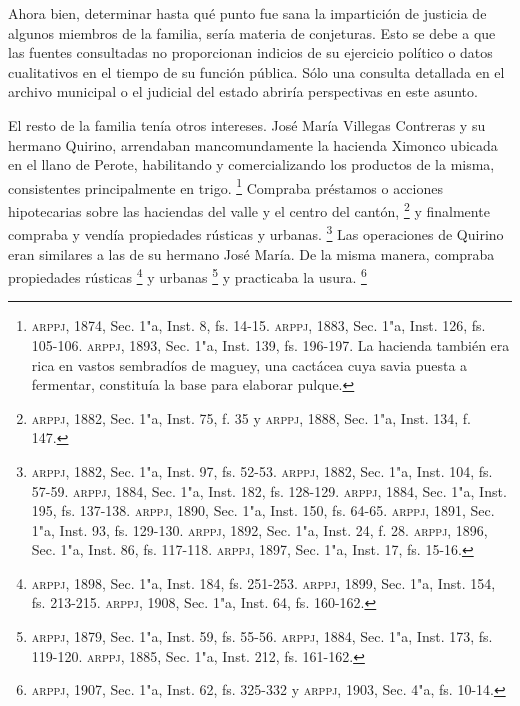 \documentclass[14pt,twoside,final]{extbook} %
\let\oldfootnote\footnote
\renewcommand\footnote[1]{%
\oldfootnote{\hspace{1mm}#1}}
\begin{document}
Ahora bien, determinar hasta qué punto fue sana la impartición de justicia de algunos miembros de la familia, sería materia de conjeturas. Esto se debe a que las fuentes consultadas no proporcionan indicios de su ejercicio político o datos cualitativos en el tiempo de su función pública. Sólo una consulta detallada en el archivo municipal o el judicial del estado abriría perspectivas en este asunto.

El resto de la familia tenía otros intereses. José María Villegas Contreras y su hermano Quirino, arrendaban mancomundamente la hacienda Ximonco ubicada en el llano de Perote, habilitando y comercializando los productos de la misma, consistentes principalmente en trigo.\footnote{\textsc{arppj}, 1874, Sec. 1"a, Inst. 8, fs. 14-15. \textsc{arppj}, 1883, Sec. 1"a, Inst. 126, fs. 105-106. \textsc{arppj}, 1893, Sec. 1"a, Inst. 139, fs. 196-197. La hacienda también era rica en vastos sembradíos de maguey, una cactácea cuya savia puesta a fermentar, constituía la base para elaborar pulque.} Compraba préstamos o acciones hipotecarias sobre las haciendas del valle y el centro del cantón,\footnote{\textsc{arppj}, 1882, Sec. 1"a, Inst. 75, f. 35 y \textsc{arppj}, 1888, Sec. 1"a, Inst. 134, f. 147.} y finalmente compraba y vendía propiedades rústicas y urbanas.\footnote{\textsc{arppj}, 1882, Sec. 1"a, Inst. 97, fs. 52-53. \textsc{arppj}, 1882, Sec. 1"a, Inst. 104, fs. 57-59. \textsc{arppj}, 1884, Sec. 1"a, Inst. 182, fs. 128-129. \textsc{arppj}, 1884, Sec. 1"a, Inst. 195, fs. 137-138. \textsc{arppj}, 1890, Sec. 1"a, Inst. 150, fs. 64-65. \textsc{arppj}, 1891, Sec. 1"a, Inst. 93, fs. 129-130. \textsc{arppj}, 1892, Sec. 1"a, Inst. 24, f. 28. \textsc{arppj}, 1896, Sec. 1"a, Inst. 86, fs. 117-118. \textsc{arppj}, 1897, Sec. 1"a, Inst. 17, fs. 15-16.} Las operaciones de Quirino eran similares a las de su hermano José María. De la misma manera, compraba propiedades rústicas\footnote{\textsc{arppj}, 1898, Sec. 1"a, Inst. 184, fs. 251-253. \textsc{arppj}, 1899, Sec. 1"a, Inst. 154, fs. 213-215. \textsc{arppj}, 1908, Sec. 1"a, Inst. 64, fs. 160-162.} y urbanas\footnote{\textsc{arppj}, 1879, Sec. 1"a, Inst. 59, fs. 55-56. \textsc{arppj}, 1884, Sec. 1"a, Inst. 173, fs. 119-120. \textsc{arppj}, 1885, Sec. 1"a, Inst. 212, fs. 161-162.} y practicaba la usura.\footnote{\textsc{arppj}, 1907, Sec. 1"a, Inst. 62, fs. 325-332 y \textsc{arppj}, 1903, Sec. 4"a, fs. 10-14.}
\end{document}
